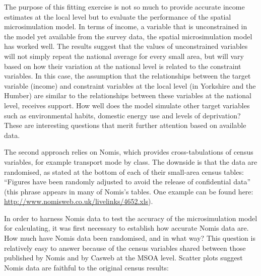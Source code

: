 \documentclass[a4paper, 11pt, twoside]{article}
\begin{document}
The purpose of this fitting exercise is not so much to provide accurate income
estimates at the local level but to evaluate the
performance of the spatial microsimulation model. In terms of income, a variable
that is unconstrained in the model yet available from the survey data, the
spatial microsimulation model has worked well. The results suggest that the
values of unconstrained variables will not simply repeat the national average
for every small area, but will vary based on how their variation at the
national level is related to the constraint variables. In this case, the
assumption that the relationships between the target variable (income) and
constraint variables at the local level (in Yorkshire and the Humber) are
similar to the relationships between these variables at the national level,
receives support. How well does the model simulate other target variables such
as environmental habits, domestic energy use and levels of deprivation?
These are interesting
questions that merit further attention based on available data.

The second approach relies on Nomis, which provides cross-tabulations of census
variables, for example transport mode by class. The downside is that the data
are randomised, as stated at the bottom of each of their small-area census
tables: ``Figures have been randomly adjusted to avoid the release of
confidential data'' (this phrase appears in many of Nomis's tables.
One example can be found here:
\href{http://www.nomisweb.co.uk/livelinks/4652.xls}{http://www.nomisweb.co.uk/livelinks/4652.xls}).

In order to harness Nomis data to test the accuracy of the microsimulation
model for calculating, it was first necessary to establish how accurate Nomis
data are. How much have Nomis data been randomised, and in what way? 
This question is relatively easy to 
answer because of the census variables shared between those published 
by Nomis and by Casweb at the MSOA level. Scatter plots
suggest Nomis data are faithful to the original census results:
\end{document}
